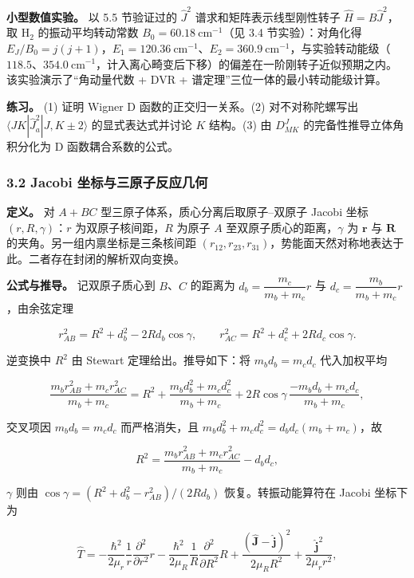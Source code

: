 \documentclass[
]{ctexbook}
\begin{document}
\textbf{小型数值实验。} 以 5.5 节验证过的 \(\hat{J}^{2}\)
谱求和矩阵表示线型刚性转子 \(\hat{H}=B\hat{J}^{2}\)，取 \(\mathrm{H}_2\)
的振动平均转动常数 \(B_0=60.18\ \mathrm{cm^{-1}}\)（见 3.4
节实验）：对角化得
\(E_J/B_0=j(j+1)\)，\(E_1=120.36\ \mathrm{cm^{-1}}\)、\(E_2=360.9\ \mathrm{cm^{-1}}\)，与实验转动能级（\(118.5\)、\(354.0\ \mathrm{cm^{-1}}\)，计入离心畸变后下移）的偏差在一阶刚转子近似预期之内。该实验演示了``角动量代数
+ DVR + 谱定理''三位一体的最小转动能级计算。

\textbf{练习。} (1) 证明 Wigner D 函数的正交归一关系。(2)
对不对称陀螺写出 \(\langle JK|\hat{J}_a^{2}|J,K\pm2\rangle\)
的显式表达式并讨论 \(K\) 结构。(3) 由 \(D^{J}_{MK}\)
的完备性推导立体角积分化为 D 函数耦合系数的公式。

\hypertarget{jacobi-ux5750ux6807ux4e0eux4e09ux539fux5b50ux53cdux5e94ux51e0ux4f55}{%
\subsubsection{3.2 Jacobi
坐标与三原子反应几何}\label{jacobi-ux5750ux6807ux4e0eux4e09ux539fux5b50ux53cdux5e94ux51e0ux4f55}}

\textbf{定义。} 对 \(A+BC\) 型三原子体系，质心分离后取原子--双原子
Jacobi 坐标 \((r,R,\gamma)\)：\(r\) 为双原子核间距，\(R\) 为原子 \(A\)
至双原子质心的距离，\(\gamma\) 为 \(\mathbf{r}\) 与 \(\mathbf{R}\)
的夹角。另一组内禀坐标是三条核间距
\((r_{12},r_{23},r_{31})\)，势能面天然对称地表达于此。二者存在封闭的解析双向变换。

\textbf{公式与推导。} 记双原子质心到 \(B\)、\(C\) 的距离为
\(d_b=\dfrac{m_c}{m_b+m_c}r\) 与
\(d_c=\dfrac{m_b}{m_b+m_c}r\)，由余弦定理

\[r_{AB}^{2}=R^{2}+d_b^{2}-2Rd_b\cos\gamma,\qquad
r_{AC}^{2}=R^{2}+d_c^{2}+2Rd_c\cos\gamma.\]

逆变换中 \(R^{2}\) 由 Stewart 定理给出。推导如下：将 \(m_b d_b=m_c d_c\)
代入加权平均

\[\frac{m_b r_{AB}^{2}+m_c r_{AC}^{2}}{m_b+m_c}
=R^{2}+\frac{m_b d_b^{2}+m_c d_c^{2}}{m_b+m_c}
+2R\cos\gamma\,\frac{-m_b d_b+m_c d_c}{m_b+m_c},\]

交叉项因 \(m_b d_b=m_c d_c\) 而严格消失，且
\(m_b d_b^{2}+m_c d_c^{2}=d_bd_c(m_b+m_c)\)，故

\[R^{2}=\frac{m_b r_{AB}^{2}+m_c r_{AC}^{2}}{m_b+m_c}-d_b d_c,\]

\(\gamma\) 则由 \(\cos\gamma=(R^{2}+d_b^{2}-r_{AB}^{2})/(2Rd_b)\)
恢复。转振动能算符在 Jacobi 坐标下为

\[\hat{T}=-\frac{\hbar^{2}}{2\mu_r}\frac{1}{r}\frac{\partial^{2}}{\partial r^{2}}r
-\frac{\hbar^{2}}{2\mu_R}\frac{1}{R}\frac{\partial^{2}}{\partial R^{2}}R
+\frac{(\hat{\mathbf{J}}-\hat{\mathbf{j}})^{2}}{2\mu_R R^{2}}
+\frac{\hat{\mathbf{j}}^{2}}{2\mu_r r^{2}},\]
\end{document}
